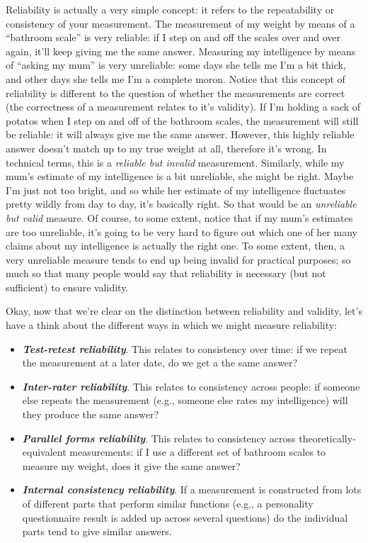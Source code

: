 \documentclass[]{book}
\providecommand{\tightlist}{%
  \setlength{\itemsep}{0pt}\setlength{\parskip}{0pt}}
\begin{document}
Reliability is actually a very simple concept: it refers to the repeatability or consistency of your measurement. The measurement of my weight by means of a ``bathroom scale'' is very reliable: if I step on and off the scales over and over again, it'll keep giving me the same answer. Measuring my intelligence by means of ``asking my mum'' is very unreliable: some days she tells me I'm a bit thick, and other days she tells me I'm a complete moron. Notice that this concept of reliability is different to the question of whether the measurements are correct (the correctness of a measurement relates to it's validity). If I'm holding a sack of potatos when I step on and off of the bathroom scales, the measurement will still be reliable: it will always give me the same answer. However, this highly reliable answer doesn't match up to my true weight at all, therefore it's wrong. In technical terms, this is a \emph{reliable but invalid} measurement. Similarly, while my mum's estimate of my intelligence is a bit unreliable, she might be right. Maybe I'm just not too bright, and so while her estimate of my intelligence fluctuates pretty wildly from day to day, it's basically right. So that would be an \emph{unreliable but valid} measure. Of course, to some extent, notice that if my mum's estimates are too unreliable, it's going to be very hard to figure out which one of her many claims about my intelligence is actually the right one. To some extent, then, a very unreliable measure tends to end up being invalid for practical purposes; so much so that many people would say that reliability is necessary (but not sufficient) to ensure validity.

Okay, now that we're clear on the distinction between reliability and validity, let's have a think about the different ways in which we might measure reliability:

\begin{itemize}
\tightlist
\item
  \textbf{\emph{Test-retest reliability}}. This relates to consistency over time: if we repeat the measurement at a later date, do we get a the same answer?
\item
  \textbf{\emph{Inter-rater reliability}}. This relates to consistency across people: if someone else repeats the measurement (e.g., someone else rates my intelligence) will they produce the same answer?
\item
  \textbf{\emph{Parallel forms reliability}}. This relates to consistency across theoretically-equivalent measurements: if I use a different set of bathroom scales to measure my weight, does it give the same answer?
\item
  \textbf{\emph{Internal consistency reliability}}. If a measurement is constructed from lots of different parts that perform similar functions (e.g., a personality questionnaire result is added up across several questions) do the individual parts tend to give similar answers.
\end{itemize}
\end{document}
